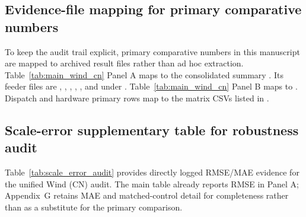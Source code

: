 \documentclass[review,1p,times]{elsarticle}
\begin{document}
\subsection{Evidence-file mapping for primary comparative numbers}
\label{subsec:evidence_mapping}
To keep the audit trail explicit, primary comparative numbers in this manuscript are mapped to archived result files rather than ad hoc extraction. Table~\ref{tab:main_wind_cn} Panel A maps to the consolidated summary . Its feeder files are , , , , , and  under . Table~\ref{tab:main_wind_cn} Panel B maps to . Dispatch and hardware primary rows map to the matrix CSVs listed in .

\subsection{Scale-error supplementary table for robustness audit}
\label{subsec:scale_error_audit}
Table~\ref{tab:scale_error_audit} provides directly logged RMSE/MAE evidence for the unified Wind (CN) audit. The main table already reports RMSE in Panel A; Appendix~G retains MAE and matched-control detail for completeness rather than as a substitute for the primary comparison.
\end{document}
